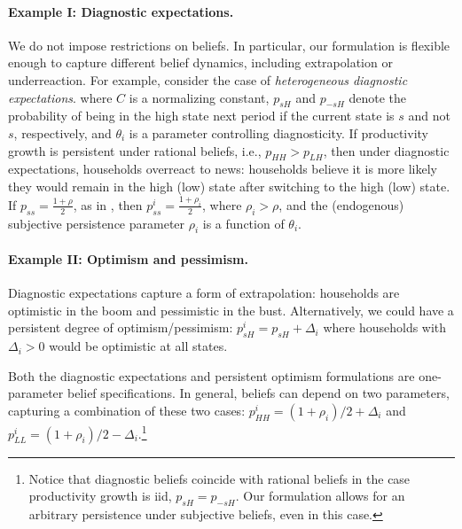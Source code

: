 \paragraph{Example I: Diagnostic expectations.} 
We do not impose restrictions on beliefs. 
In particular, our formulation is flexible enough to capture different belief dynamics, including extrapolation or underreaction. 
For example, consider the case of \textit{heterogeneous diagnostic expectations}. 
where $C$ is a normalizing constant, $p_{sH}$ and $p_{-sH}$ denote the probability of being in the high state next period if the current state is $s$ and not $s$, respectively, and $\theta_i$ is a parameter controlling diagnosticity.
If productivity growth is persistent under rational beliefs, i.e., $p_{HH} > p_{LH}$, then under diagnostic expectations, households overreact to news: households believe it is more likely they would remain in the high (low) state after switching to the high (low) state.
If $p_{ss} = \frac{1+\rho}{2}$, as in \citet{MP85}, then $p_{ss}^i = \frac{1+\rho_i}{2}$,  where $\rho_i > \rho$, and the (endogenous) subjective persistence parameter $\rho_i$ is a function of $\theta_i$.

\paragraph{Example II: Optimism and pessimism.}  Diagnostic expectations capture a form of extrapolation: households are optimistic in the boom and pessimistic in the bust. 
Alternatively, we could have a persistent degree of optimism/pessimism: $ p_{sH}^i = p_{sH} + \Delta_i$
where households with $\Delta_i > 0$ would be optimistic at all states.

Both the diagnostic expectations and persistent optimism formulations are one-parameter belief specifications. 
In general, beliefs can depend on two parameters, capturing a combination of these two cases: $ p_{HH}^i = (1+\rho_i)/2+\Delta_i$ and $p_{LL}^i = (1+\rho_i)/2 -\Delta_i.$\footnote{Notice that diagnostic beliefs coincide with rational beliefs in the case productivity growth is iid, $p_{sH} = p_{-sH}$. 
Our formulation allows for an arbitrary persistence under subjective beliefs, even in this case.
}

